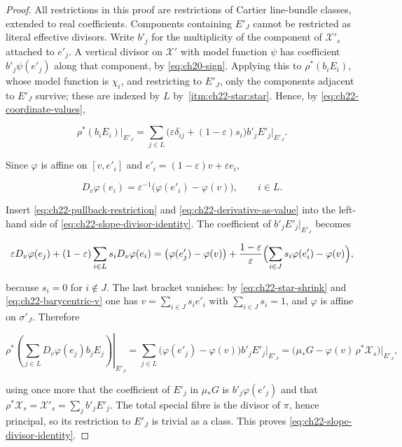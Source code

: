 \begin{proof}
All restrictions in this proof are restrictions of Cartier line-bundle
classes, extended to real coefficients.  Components containing $E'_J$
cannot be restricted as literal effective divisors.  Write $b'_j$ for the
multiplicity of the component of $\mathcal X'_s$ attached to $e'_j$.
A vertical divisor on
$\mathcal X'$ with model function $\psi$ has coefficient
$b'_j\psi(e'_j)$ along that component, by
\eqref{eq:ch20-sign}.  Applying this to
$\rho^*(b_iE_i)$, whose model function is $\chi_i$, and restricting to
$E'_J$, only the components adjacent to $E'_J$ survive; these are indexed
by $L$ by \,\cref{itm:ch22-star:star}.  Hence,
by \eqref{eq:ch22-coordinate-values},

\[
 \rho^*(b_iE_i)|_{E'_J}
   =\sum_{j\in L}\bigl(\varepsilon\delta_{ij}
        +(1-\varepsilon)s_i\bigr)b'_jE'_j\big|_{E'_J}.
\tag{22.41}\label{eq:ch22-pullback-restriction}
\]

Since $\varphi$ is affine on $[v,e'_i]$ and
$e'_i=(1-\varepsilon)v+\varepsilon e_i$,

\[
 D_v\varphi(e_i)
   =\varepsilon^{-1}\bigl(\varphi(e'_i)-\varphi(v)\bigr),
       \qquad i\in L .
\tag{22.42}\label{eq:ch22-derivative-as-value}
\]

Insert \eqref{eq:ch22-pullback-restriction} and
\eqref{eq:ch22-derivative-as-value} into the left-hand side of
\eqref{eq:ch22-slope-divisor-identity}.  The coefficient of
$b'_jE'_j|_{E'_J}$ becomes

\[
 \varepsilon D_v\varphi(e_j)
 +(1-\varepsilon)\sum_{i\in L}s_iD_v\varphi(e_i)
 =\bigl(\varphi(e'_j)-\varphi(v)\bigr)
 +\frac{1-\varepsilon}{\varepsilon}
   \Bigl(\sum_{i\in J}s_i\varphi(e'_i)-\varphi(v)\Bigr),
\]

because $s_i=0$ for $i\notin J$.  The last bracket vanishes: by
\eqref{eq:ch22-star-shrink} and \eqref{eq:ch22-barycentric-v} one has
$v=\sum_{i\in J}s_ie'_i$ with $\sum_{i\in J}s_i=1$, and $\varphi$ is
affine on $\sigma'_J$.  Therefore

\[
 \left.
 \rho^*\!\left(\sum_{j\in L}D_v\varphi(e_j)b_jE_j\right)\right|_{E'_J}
 =\sum_{j\in L}\bigl(\varphi(e'_j)-\varphi(v)\bigr)b'_jE'_j\big|_{E'_J}
 =\bigl(\mu_*G-\varphi(v)\,\rho^*\mathcal X_s\bigr)\big|_{E'_J},
\]

using once more that the coefficient of $E'_j$ in $\mu_*G$ is
$b'_j\varphi(e'_j)$ and that
$\rho^*\mathcal X_s=\mathcal X'_s=\sum_{j}b'_jE'_j$.  The total special
fibre is the divisor of $\pi$, hence principal, so its restriction to
$E'_J$ is trivial as a class.  This proves
\eqref{eq:ch22-slope-divisor-identity}.
\end{proof}

